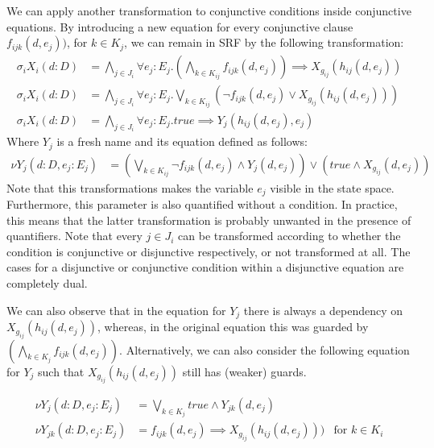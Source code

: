 \documentclass{article}
\begin{document}
We can apply another transformation to conjunctive conditions inside conjunctive equations.
By introducing a new equation for every conjunctive clause $f_{ijk}(d,e_j))$, for $k \in K_j$, we can remain in SRF by the following transformation:
\begin{align*}
  \sigma_i X_i(d:D) &= \bigwedge\limits_{j \in J_i} \forall e_j : E_j . (\bigwedge\limits_{k \in K_{ij}} f_{ijk}(d,e_j)) \implies X_{g_{ij}}(h_{ij}(d, e_j)) \\  
  \sigma_i X_i(d:D) &= \bigwedge\limits_{j \in J_i} \forall e_j : E_j . \bigvee\limits_{k \in K_{ij}} (\neg f_{ijk}(d,e_j) \lor X_{g_{ij}}(h_{ij}(d, e_j))) \\
  \sigma_i X_i(d:D) &= \bigwedge\limits_{j \in J_i} \forall e_j : E_j .  \textit{true} \implies Y_j(h_{ij}(d, e_j), e_j)
\end{align*}
Where $Y_j$ is a fresh name and its equation defined as follows:
\begin{align*}
  \nu Y_j(d : D, e_j : E_j) &= (\bigvee\limits_{k \in K_{ij}} \neg f_{ijk}(d,e_j) \land Y_j(d, e_j)) \lor (\textit{true} \land X_{g_{ij}}(d, e_j))
\end{align*}
Note that this transformations makes the variable $e_j$ visible in the state space.
Furthermore, this parameter is also quantified without a condition.
In practice, this means that the latter transformation is probably unwanted in the presence of quantifiers.
Note that every $j \in J_i$ can be transformed according to whether the condition is conjunctive or disjunctive respectively, or not transformed at all.
The cases for a disjunctive or conjunctive condition within a disjunctive equation are completely dual.

We can also observe that in the equation for $Y_j$ there is always a dependency on $X_{g_{ij}}(h_{ij}(d, e_j))$, whereas, in the original equation this was guarded by $(\bigwedge\limits_{k \in K_j} f_{ijk}(d,e_j))$.
Alternatively, we can also consider the following equation for $Y_j$ such that $X_{g_{ij}}(h_{ij}(d, e_j))$ still has (weaker) guards.

\begin{align*}
  \nu Y_j(d : D, e_j : E_j) &= \bigvee\limits_{k \in K_j} \textit{true} \land Y_{jk}(d, e_j) \\
  \nu Y_{jk}(d : D, e_j : E_j) &= f_{ijk}(d,e_j) \implies X_{g_{ij}}(h_{ij}(d, e_j))) & \text{for } k \in K_i
\end{align*}


\newcommand{\pre}[3][]{\ensuremath{\textsf{pre}(#2,#3)}}
\newcommand{\cpre}[4][]{\ensuremath{\textsf{cpre}_{#2}(#3,#4)}}
\newcommand{\spre}[4][]{\ensuremath{\textsf{spre}_{#2}(#3,#4)}}
\end{document}
